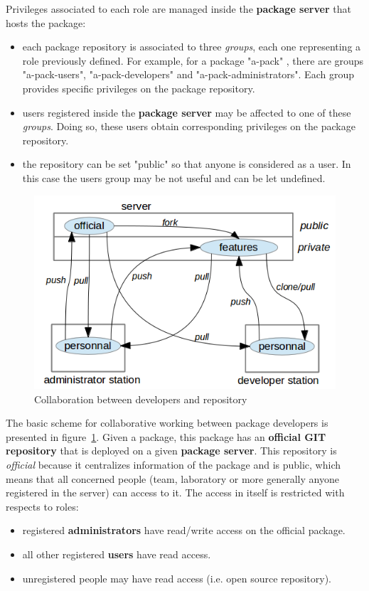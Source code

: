 \documentclass[12pt,a4paper]{article}
\begin{document}
Privileges associated to each role are managed inside the \textbf{package server} that hosts the package: 
\begin{itemize}
\item each package repository is associated to three \textit{groups}, each one representing a role previously defined. For example, for a package "a-pack" , there are groups "a-pack-users", "a-pack-developers" and "a-pack-administrators". Each group provides specific privileges on the package repository.
\item users registered inside the \textbf{package server} may be affected to one of these \textit{groups}. Doing so, these users obtain corresponding privileges on the package repository.
\item the repository can be set "public" so that anyone is considered as a user. In this case the users group may be not useful and can be let undefined.
\end{itemize}

\begin{figure}
\center
\includegraphics[scale=1]{images/collaborativework.png}
\caption{Collaboration between developers and repository}
\label{fig:collaborativeWork}
\end{figure}

The basic scheme for collaborative working between package developers is presented in figure~\ref{fig:collaborativeWork}. 
Given a package, this package has an \textbf{official GIT repository} that is deployed on a given \textbf{package server}. This repository is \textit{official} because it centralizes information of the package and is public, which means that all concerned people (team, laboratory or more generally anyone registered in the server) can access to it. The access in itself is restricted with respects to roles:
\begin{itemize}
\item registered \textbf{administrators} have read/write access on the official package.
\item all other registered \textbf{users} have read access.
\item unregistered people may have read access (i.e. open source repository).
\end{itemize}
\end{document}

